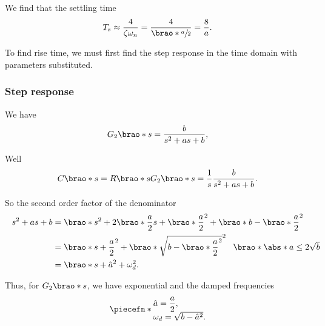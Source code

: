 \documentclass[12pt]{article}
\DeclarePairedDelimiter\brao()%
\DeclarePairedDelimiter\abs||
\DeclarePairedDelimiter\piecefn\{.
\begin{document}
\begin{enumerate}[(a)]
        We find that the settling time
        \begin{equation}\label{eq:settling time}
            T_s \approx \frac4{\zeta\omega_n} = \frac4{\brao*{\sfrac{a}2}} = \frac8a.
        \end{equation}

        To find rise time, we must first find the step response in the time domain with parameters substituted.

        \subsubsection{Step response}
        We have
        \[
            G_2\brao*s = \frac{b}{s^2 + as + b},
        \]

        Well
        \begin{equation}
            C\brao*s = R\brao*s G_2\brao*s = \frac1s \frac{b}{s^2 + as + b}.
        \end{equation}

        So the second order factor of the denominator
        \begin{equation}\label{eq:sum of squares}
            \begin{aligned}
                s^2 + as + b
                &{} = \brao*{s^2 + 2\brao*{\frac{a}2}s + \brao*{\frac{a}2}^2} + \brao*{b - \brao*{\frac{a}2}^2}
            \\*
                &{} = \brao*{s + \frac{a}2}^2 + \brao*{\sqrt{b - \brao*{\frac{a}2}^2}}^2
                \rlap{
                    $\hskip0.5em\brao*{\abs*{a} \leq 2\sqrt{b}}$
                }
            \\*
                &{}= \brao*{s + \hat{a}}^2 + \omega_d^2.
            \\*
            \end{aligned}
        \end{equation}

        Thus, for $G_2\brao*s$, we have exponential and the damped frequencies
        \begin{equation}\label{eq:Laplace constants}
            \piecefn*{
                \begin{array}{@{}l@{}}
                    \displaystyle
                    \hat{a} = \frac{a}2, \\*
                    \omega_d = \sqrt{b - \hat{a}^2}. \\*
                \end{array}
            }
        \end{equation}


\end{enumerate}
\end{document}
